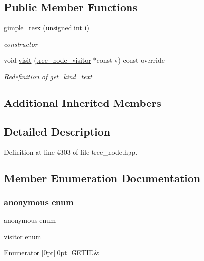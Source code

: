\subsection*{Public Member Functions}
\begin{DoxyCompactItemize}
\item 
\hyperlink{structgimple__resx_a308abb85c21f804773c5b07e4f8edee8}{gimple\+\_\+resx} (unsigned int i)
\begin{DoxyCompactList}\small\item\em constructor \end{DoxyCompactList}\item 
void \hyperlink{structgimple__resx_aeaec0bead312592457e09d043bc76fea}{visit} (\hyperlink{classtree__node__visitor}{tree\+\_\+node\+\_\+visitor} $\ast$const v) const override
\begin{DoxyCompactList}\small\item\em Redefinition of get\+\_\+kind\+\_\+text. \end{DoxyCompactList}\end{DoxyCompactItemize}
\subsection*{Additional Inherited Members}


\subsection{Detailed Description}


Definition at line 4303 of file tree\+\_\+node.\+hpp.



\subsection{Member Enumeration Documentation}
\mbox{\label{structgimple__resx_a89e769b487966c6c61df79ee86472a30}} 
\subsubsection{\texorpdfstring{anonymous enum}{anonymous enum}}
{\footnotesize\ttfamily anonymous enum}



visitor enum 

\begin{DoxyEnumFields}{Enumerator}
[0pt][0pt]{}\mbox{\label{structgimple__resx_a89e769b487966c6c61df79ee86472a30a584472dc981d29b7f8ec4eb3babed3a7}} 
G\+E\+T\+ID&\\
\hline

\end{DoxyEnumFields}



